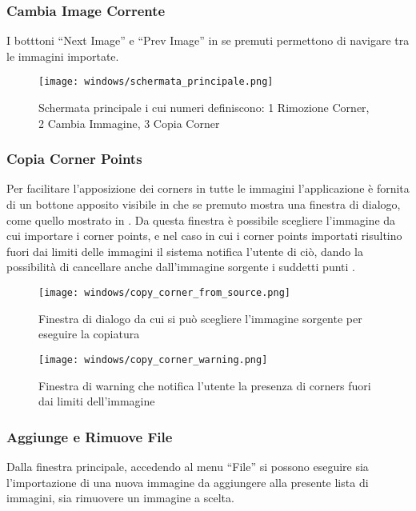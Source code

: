 \subsubsection{Cambia Image Corrente}
\noindent I botttoni ``Next Image'' e ``Prev Image'' in  se premuti permettono di navigare tra le immagini importate.

\begin{figure}[H]
    \centering
    \texttt{[image: windows/schermata\_principale.png]}
    \caption{Schermata principale i cui numeri definiscono: 1 Rimozione Corner, 2 Cambia Immagine, 3 Copia Corner}
    \label{fig:12}
\end{figure}

\subsubsection{Copia Corner Points}
\noindent Per facilitare l'apposizione dei corners in tutte le immagini l'applicazione è fornita di un bottone apposito visibile in  che se premuto mostra una finestra di dialogo, come quello mostrato in . Da questa finestra è possibile scegliere l'immagine da cui importare i corner points, e nel caso in cui i corner points importati risultino fuori dai limiti delle immagini il sistema notifica l'utente di ciò, dando la possibilità di cancellare anche dall'immagine sorgente i suddetti punti .

\begin{figure}[H]
    \centering
    \texttt{[image: windows/copy\_corner\_from\_source.png]}
    \caption{Finestra di dialogo da cui si può scegliere l'immagine sorgente per eseguire la copiatura}
    \label{fig:13}
\end{figure}

\begin{figure}[H]
    \centering
    \texttt{[image: windows/copy\_corner\_warning.png]}
    \caption{Finestra di warning che notifica l'utente la presenza di corners fuori dai limiti dell'immagine}
    \label{fig:14}
\end{figure}

\subsubsection{Aggiunge e Rimuove File}
\noindent Dalla finestra principale, accedendo al menu ``File'' si possono eseguire sia l'importazione di una nuova immagine da aggiungere alla presente lista di immagini, sia rimuovere un immagine a scelta.

